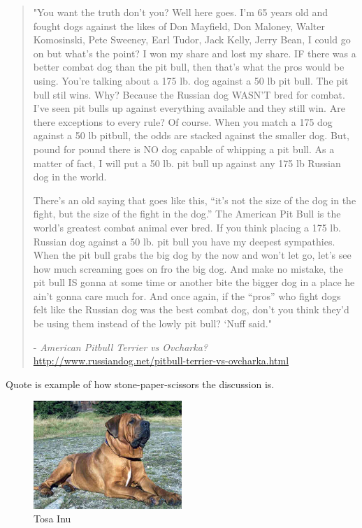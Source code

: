 \blockquote{"You want the truth don’t you? Well here goes. I’m 65 years old and fought dogs against the likes of Don Mayfield, Don Maloney, Walter Komosinski, Pete Sweeney, Earl Tudor, Jack Kelly, Jerry Bean, I could go on but what’s the point? I won my share and lost my share. IF there was a better combat dog than the pit bull, then that’s what the pros would be using. You’re talking about a 175 lb. dog against a 50 lb pit bull. The pit bull stil wins. Why? Because the Russian dog WASN’T bred for combat. I’ve seen pit bulls up against everything available and they still win. Are there exceptions to every rule? Of course. When you match a 175 dog against a 50 lb pitbull, the odds are stacked against the smaller dog. But, pound for pound there is NO dog capable of whipping a pit bull. As a matter of fact, I will put a 50 lb. pit bull up against any 175 lb Russian dog in the world. \

There’s an old saying that goes like this, “it’s not the size of the dog in the fight, but the size of the fight in the dog.” The American Pit Bull is the world’s greatest combat animal ever bred. If you think placing a 175 lb. Russian dog against a 50 lb. pit bull you have my deepest sympathies. When the pit bull grabs the big dog by the now and won’t let go, let’s see how much screaming goes on fro the big dog. And make no mistake, the pit bull IS gonna at some time or another bite the bigger dog in a place he ain’t gonna care much for. And once again, if the “pros” who fight dogs felt like the Russian dog was the best combat dog, don’t you think they’d be using them instead of the lowly pit bull? ‘Nuff said."\

- \textit{American Pitbull Terrier vs Ovcharka?} \url{http://www.russiandog.net/pitbull-terrier-vs-ovcharka.html}
\label{pitbullQuote}}

Quote is example of how stone-paper-scissors the discussion is.\

\begin{figure} 
	\centering
    \includegraphics[width=0.5\textwidth]{tosa.jpg}
    \caption{Tosa Inu}
    \label{fig:tosa}
\end{figure}

